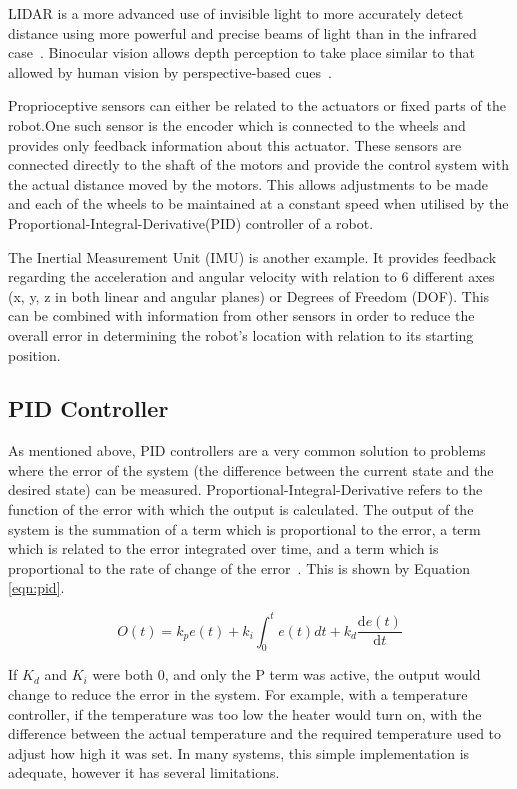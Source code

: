 LIDAR is a more advanced use of invisible light to more accurately detect 
distance using more powerful and precise beams of light than in the infrared 
case~\cite{lidar}. Binocular vision allows depth perception to take place 
similar to that allowed by human vision by perspective-based cues~\cite{read2005early, pfautz2002depth}. 

Proprioceptive sensors can either be related to the actuators or fixed parts of the 
robot.One such sensor is the encoder which is connected to the wheels and provides 
only feedback information about this actuator. These sensors are connected 
directly to the shaft of the motors and provide the control system with the 
actual distance moved by the motors. This allows adjustments to be made and each 
of the wheels to be maintained at a constant speed when utilised by the 
Proportional-Integral-Derivative(PID) controller of a robot. 


The Inertial Measurement Unit (IMU) is another example. It provides feedback regarding the acceleration and angular 
velocity with relation to 6 different axes (x, y, z in both linear and angular 
planes) or Degrees of Freedom (DOF). This can be combined with information from 
other sensors in order to reduce the overall error in determining the robot's 
location with relation to its starting position.  

\subsection{PID Controller}\label{litreview/robotics/pid}
As mentioned above, PID controllers are a very common solution to problems where the error of the
system (the difference between the current state and the desired state) can be
measured. Proportional-Integral-Derivative refers to the
function of the error with which the output is calculated. The output of the
system is the summation of a term which is proportional to the error, a term
which is related to the error integrated over time, and a term which is
proportional to the rate of change of the error~\cite{aastrom2006advanced}. This is shown by Equation \ref{eqn:pid}.

\begin{equation}
\label{eqn:pid}
O(t) = k_{p}e(t) + k_i\int_{0}^{t}e(t)dt + k_d \frac{\mathrm{d} e(t) }{\mathrm{d} t}
\end{equation}

If $K_d$ and $K_i$ were both 0, and only the P term was active, the output
would change to reduce the error in the system. For example, with a
temperature controller, if the temperature was too low the heater would
turn on, with the difference between the actual temperature and the required
temperature used to adjust how high it was set. In many systems, this simple
implementation is adequate, however it has several limitations.

